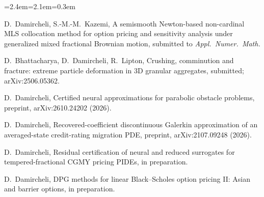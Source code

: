 \documentclass[11pt]{article}
\newcommand{\rc}[1]{\textcolor{accent}{[#1]}}
\begin{document}
{\begin{list}{}{\leftmargin=2.4em=2.1em=0.3em\itemsep=0pt\parsep=0pt}
\item[\rc{S4}] D.~Damircheli, S.-M.-M.~Kazemi, A semismooth Newton-based non-cardinal MLS collocation method for option pricing and sensitivity analysis under generalized mixed fractional Brownian motion, submitted to \emph{Appl.\ Numer.\ Math.}
\item[\rc{S5}] D.~Bhattacharya, D.~Damircheli, R.~Lipton, Crushing, comminution and fracture: extreme particle deformation in 3D granular aggregates, submitted; arXiv:2506.05362.
\item[\rc{P1}] D.~Damircheli, Certified neural approximations for parabolic obstacle problems, preprint, arXiv:2610.24202 (2026).
\item[\rc{P2}] D.~Damircheli, Recovered-coefficient discontinuous Galerkin approximation of an averaged-state credit-rating migration PDE, preprint, arXiv:2107.09248 (2026).
\item[\rc{M1}] D.~Damircheli, Residual certification of neural and reduced surrogates for tempered-fractional CGMY pricing PIDEs, in preparation.
\item[\rc{M2}] D.~Damircheli, DPG methods for linear Black--Scholes option pricing II: Asian and barrier options, in preparation.
\end{list}
}
\end{document}
